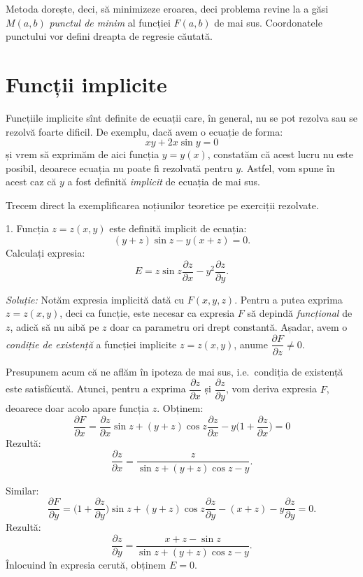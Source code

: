 Metoda dorește, deci, să minimizeze eroarea, deci problema revine la a găsi
$ M(a, b) $ \emph{punctul de minim} al funcției $ F(a, b) $ de mai sus.
Coordonatele punctului vor defini dreapta de regresie căutată.


\section{Funcții implicite}


Funcțiile implicite sînt definite de ecuații care, în general, nu se pot
rezolva sau se rezolvă foarte dificil. De exemplu, dacă avem o ecuație
de forma:
\[
  xy + 2x\sin y = 0
\]
și vrem să exprimăm de aici funcția $ y = y(x) $, constatăm că acest
lucru nu este posibil, deoarece ecuația nu poate fi rezolvată pentru $ y $.
Astfel, vom spune în acest caz că $ y $ a fost definită \emph{implicit}
de ecuația de mai sus.

Trecem direct la exemplificarea noțiunilor teoretice pe exerciții rezolvate.

\vspace{0.5cm}

1. Funcția $ z = z(x, y) $ este definită implicit de ecuația:
\[
  (y + z) \sin z - y (x + z) = 0.
\]
Calculați expresia:
\[
  E = z \sin z \frac{\partial z}{\partial x} - y^2 \frac{\partial z}{\partial y}.
\]

\emph{Soluție:} Notăm expresia implicită dată cu $ F(x, y, z) $. Pentru a putea
exprima $ z = z(x, y) $, deci ca funcție, este necesar ca expresia $ F $ să depindă
\emph{funcțional} de $ z $, adică să nu aibă pe $ z $ doar ca parametru ori drept
constantă. Așadar, avem o \emph{condiție de existență} a funcției implicite
$ z = z(x, y) $, anume $ \dfrac{\partial F}{\partial z} \neq 0 $.

Presupunem acum că ne aflăm în ipoteza de mai sus, i.e.\ condiția de existență
este satisfăcută. Atunci, pentru a exprima $ \dfrac{\partial z}{\partial x} $
și $ \dfrac{\partial z}{\partial y} $, vom deriva expresia $ F $, deoarece
doar acolo apare funcția $ z $. Obținem:
\[
  \frac{\partial F}{\partial x} = \frac{\partial z}{\partial x} \sin z + %
  (y + z) \cos z \dfrac{\partial z}{\partial x} - %
  y\Big(1 + \dfrac{\partial z}{\partial x} \Big) = 0
\]
Rezultă:
\[
  \frac{\partial z}{\partial x} = \frac{z}{\sin z + (y + z) \cos z - y}.
\]

Similar:
\[
  \frac{\partial F}{\partial y} = \Big(1 + \frac{\partial z}{\partial y} \Big) \sin z + %
  (y + z) \cos z \frac{\partial z}{\partial y} - (x + z) - y \frac{\partial z}{\partial y} = 0.
\]
Rezultă:
\[
  \frac{\partial z}{\partial y} = \dfrac{x + z - \sin z}{\sin z + (y + z)\cos z - y}.
\]
Înlocuind în expresia cerută, obținem $ E = 0 $.

